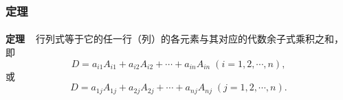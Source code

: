 \subsubsection{定理}
\paragraph{}
\textbf{定理~~}行列式等于它的任一行（列）的各元素与其对应的代数余子式乘积之和，即
\begin{equation*}
  D = a_{i1}A_{i1} + a_{i2}A_{i2} + \cdots + a_{in}A_{in} \; (i = 1,2,\cdots,n),
\end{equation*}
或
\begin{equation*}
  D = a_{1j}A_{1j} + a_{2j}A_{2j} + \cdots + a_{nj}A_{nj} \; (j = 1,2,\cdots,n).
\end{equation*}


